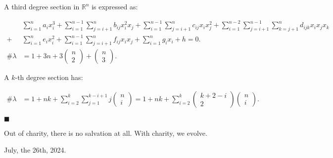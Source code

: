 \documentclass[12pt]{article}
\begin{document}
A third degree section in $\mathbb{R}^n$ is expressed as:

\begin{align}
&\sum_{i=1}^n a_i x_i^3 +\sum_{i=1}^{n-1} \sum_{j=i+1}^n b_{ij} x_i^2 x_j
+\sum_{i=1}^{n-1} \sum_{j=i+1}^n c_{ij} x_i x_j^2 +\sum_{i=1}^{n-2}\sum_{j=i+1}^{n-1} \sum_{k=j+1}^n d_{ijk} x_i x_j x_k \nonumber\\
+ &\sum_{i=1}^n e_i x_i^2 +\sum_{i=1}^{n-1} \sum_{j=i+1}^n f_{ij} x_i x_j+  \sum_{i=1}^n g_i x_i + h = 0. \\
\# \lambda &= 1 + 3n + 3\begin{pmatrix}
    n \\ 2
\end{pmatrix} + \begin{pmatrix}
    n \\ 3
\end{pmatrix}.
\end{align}

A $k$-th degree section has:

\begin{align}
    \# \lambda &= 1 + n k + \sum_{i=2}^{k} \sum_{j=1}^{k-i+1} j \begin{pmatrix}
        n \\ i
    \end{pmatrix} = 1 + n k + \sum_{i=2}^{k} \begin{pmatrix}
        k+2-i \\ 2
    \end{pmatrix}  \begin{pmatrix}
        n \\ i
    \end{pmatrix}.
   \end{align} 

\vspace{6mm}

$\blacksquare$

\vspace{12mm}

Out of charity, there is no salvation at all. With charity, we evolve.

July, the 26th, 2024.

%
\end{document}
